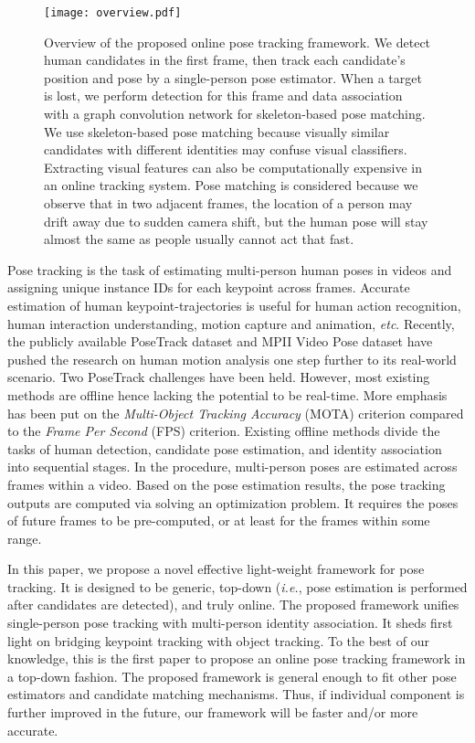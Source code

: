 \documentclass[10pt,twocolumn,letterpaper]{article}
\begin{document}
	\begin{figure*}
		\centering
		\texttt{[image: overview.pdf]}
		\caption{Overview of the proposed online pose tracking framework. We detect human candidates in the first frame, then track each candidate's position and pose by a single-person pose estimator. When a target is lost, we perform detection for this frame and data association with a graph convolution network for skeleton-based pose matching. We use skeleton-based pose matching because visually similar candidates with different identities may confuse visual classifiers. Extracting visual features can also be computationally expensive in an online tracking system. Pose matching is considered because we observe that in two adjacent frames, the location of a person may drift away due to sudden camera shift, but the human pose will stay almost the same as people usually cannot act that fast.} 
		\label{fig:overview}
		\vspace{-.2in}
	\end{figure*}
	
	Pose tracking is the task of estimating multi-person human poses in videos and assigning unique instance IDs for each keypoint across frames. Accurate estimation of human keypoint-trajectories is useful for human action recognition, human interaction understanding, motion capture and animation, \emph{etc}.
	Recently, the publicly available PoseTrack dataset \cite{iqbal2017posetrack, andriluka2018posetrack} and MPII Video Pose dataset \cite{insafutdinov2017arttrack} have pushed the research on human motion analysis one step further to its real-world scenario.
	Two PoseTrack challenges have been held. 
	However, most existing methods are offline hence lacking the potential to be real-time. More emphasis has been put on the \textit{Multi-Object Tracking Accuracy} (MOTA) criterion compared to the \textit{Frame Per Second} (FPS) criterion. 
	Existing offline methods divide the tasks of human detection, candidate pose estimation, and identity association into sequential stages.
	In the procedure, multi-person poses are estimated across frames within a video. Based on the pose estimation results, the pose tracking outputs are computed via solving an optimization problem. It requires the poses of future frames to be pre-computed, or at least for the frames within some range. 

	In this paper, we propose a novel effective light-weight framework for pose tracking. It is designed to be generic, top-down (\emph{i.e.}, pose estimation is performed after candidates are detected), and truly online.  
	The proposed framework unifies single-person pose tracking with multi-person identity association. It sheds first light on bridging keypoint tracking with object tracking.
	To the best of our knowledge, this is the first paper to propose an online pose tracking framework in a top-down fashion. The proposed framework is general enough to fit other pose estimators and candidate matching mechanisms. Thus, if individual component is further improved in the future, our framework will be faster and/or more accurate.
	
\end{document}
